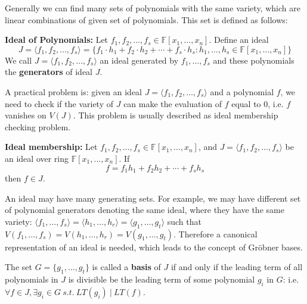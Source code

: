 Generally we can find many sets of polynomials with the same variety, which are linear combinations
of given set of polynomials. This set is defined as follows:
\begin{Definition}
{\bf Ideal of Polynomials:} Let $f_1,f_2,\dots,f_s\in \mathbb F[x_1,\dots,x_n]$.
Define an ideal
$$J = \langle f_1,f_2,\dots,f_s\rangle = \{f_1\cdot h_1 + f_2\cdot h_2 +\cdots + f_s\cdot h_s : h_1,\dots,h_s\in \mathbb F[x_1,\dots,x_n]\}$$
We call $J = \langle f_1,f_2,\dots,f_s\rangle$ an ideal generated by $f_1,\dots,f_s$ and these polynomials 
the {\bf generators} of ideal $J$.
\end{Definition}
A practical problem is: given an ideal $J = \langle f_1,f_2,\dots,f_s\rangle$ and a polynomial $f$,
we need to check if the variety of $J$ can make the evaluation of $f$ equal to 0, i.e. $f$ vanishes on $V(J)$.
This problem is usually described as ideal membership checking problem.
\begin{Definition}
{\bf Ideal membership:} Let $f_1,f_2,\dots,f_s\in \mathbb F[x_1,\dots,x_n]$, and $J = \langle f_1,f_2,\dots,f_s\rangle$
be an ideal over ring $\mathbb F[x_1,\dots,x_n]$. If 
$$f = f_1h_1 + f_2h_2 + \cdots + f_sh_s$$
then $f\in J$.
\end{Definition}

An ideal may have many generating sets. For example, we may have different set of polynomial generators denoting
the same ideal, where they have the same variety: $\langle f_1,\dots,f_s\rangle = \langle h_1,\dots,h_r\rangle
= \langle g_1,\dots,g_t\rangle$ such that $V(f_1,\dots,f_s) = V(h_1,\dots,h_r) = V(g_1,\dots,g_t)$.
Therefore a canonical representation of an ideal is needed, which leads to the concept of Gr\"obner bases.

\begin{Definition}
The set $G = \{g_1, \dots,
g_t\}$ is called a \textbf{\Grobner basis} of $J$ if and only if the
leading term of all polynomials in $J$ is divisible be the leading
term of some polynomial $g_i$ in $G$: i.e. $\forall f \in J, \exists
g_i \in G \ s.t. \ LT(g_i) ~|~ LT(f)$. 
\end{Definition}

